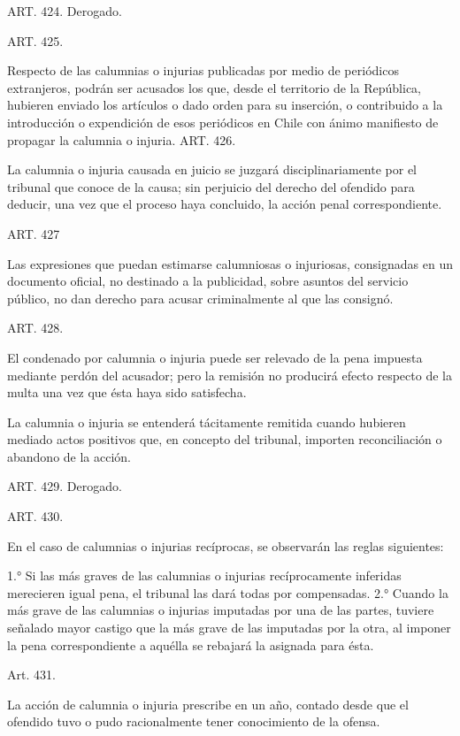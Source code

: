     ART. 424. Derogado.

    ART. 425.

    Respecto de las calumnias o injurias publicadas por medio de periódicos extranjeros, podrán ser acusados los que, desde el territorio de la República, hubieren enviado los artículos o dado orden para su inserción, o contribuido a la introducción o expendición de esos periódicos en Chile con ánimo manifiesto de propagar la calumnia o injuria.
    ART. 426.

    La calumnia o injuria causada en juicio se juzgará disciplinariamente por el tribunal que conoce de la causa; sin perjuicio del derecho del ofendido para deducir, una vez que el proceso haya concluido, la acción penal correspondiente.


    ART. 427

    Las expresiones que puedan estimarse calumniosas o injuriosas, consignadas en un documento oficial, no destinado a la publicidad, sobre asuntos del servicio público, no dan derecho para acusar criminalmente al que las consignó.


    ART. 428.

    El condenado por calumnia o injuria puede ser relevado de la pena impuesta mediante perdón del acusador; pero la remisión no producirá efecto respecto de la multa una vez que ésta haya sido satisfecha.

    La calumnia o injuria se entenderá tácitamente remitida cuando hubieren mediado actos positivos que, en concepto del tribunal, importen reconciliación o abandono de la acción.

    ART. 429. Derogado.

    ART. 430.

    En el caso de calumnias o injurias recíprocas, se observarán las reglas siguientes:

    1.° Si las más graves de las calumnias o injurias recíprocamente inferidas merecieren igual pena, el tribunal las dará todas por compensadas.
    2.° Cuando la más grave de las calumnias o injurias imputadas por una de las partes, tuviere señalado mayor castigo que la más grave de las imputadas por la otra, al imponer la pena correspondiente a aquélla se rebajará la asignada para ésta.




    Art. 431.

    La acción de calumnia o injuria prescribe en un año, contado desde que el ofendido tuvo o pudo racionalmente tener conocimiento de la ofensa.

